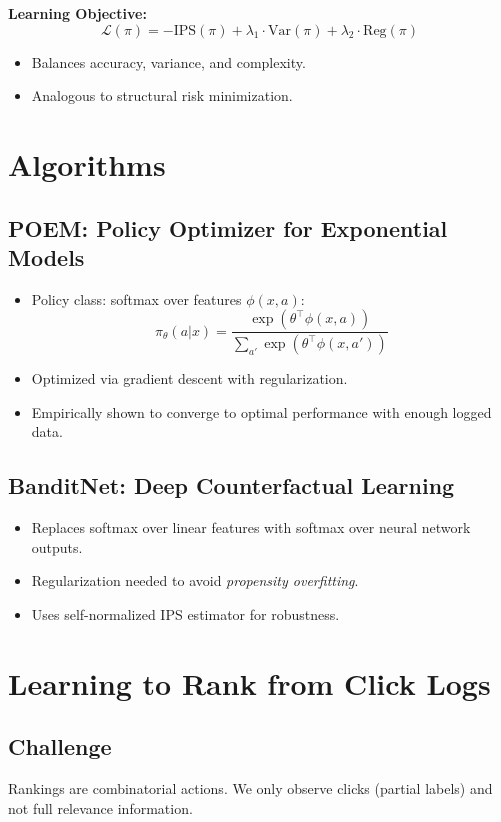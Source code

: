\documentclass[11pt]{article}
\begin{document}
\textbf{Learning Objective:}
\[
\mathcal{L}(\pi) = -\text{IPS}(\pi) + \lambda_1 \cdot \text{Var}(\pi) + \lambda_2 \cdot \text{Reg}(\pi)
\]
\begin{itemize}
  \item Balances accuracy, variance, and complexity.
  \item Analogous to structural risk minimization.
\end{itemize}

\section{Algorithms}

\subsection{POEM: Policy Optimizer for Exponential Models}
\begin{itemize}
  \item Policy class: softmax over features $\phi(x,a)$:
  \[
  \pi_\theta(a|x) = \frac{\exp(\theta^\top \phi(x,a))}{\sum_{a'} \exp(\theta^\top \phi(x,a'))}
  \]
  \item Optimized via gradient descent with regularization.
  \item Empirically shown to converge to optimal performance with enough logged data.
\end{itemize}

\subsection{BanditNet: Deep Counterfactual Learning}
\begin{itemize}
  \item Replaces softmax over linear features with softmax over neural network outputs.
  \item Regularization needed to avoid \textit{propensity overfitting}.
  \item Uses self-normalized IPS estimator for robustness.
\end{itemize}

\section{Learning to Rank from Click Logs}

\subsection*{Challenge}
Rankings are combinatorial actions. We only observe clicks (partial labels) and not full relevance information.
\end{document}
